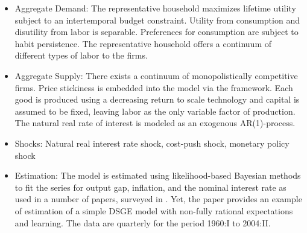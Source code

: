 \documentclass[11pt,a4paper]{article}
\begin{document}
	
	\begin{itemize}
		
		\item Aggregate Demand: The representative household maximizes lifetime utility subject to an intertemporal budget constraint. Utility from consumption and disutility from labor is separable. Preferences for consumption are subject to habit persistence. The representative household offers a continuum of different types of labor to the firms.
		
		\item Aggregate Supply: There exists a continuum of monopolistically competitive firms. Price stickiness is embedded into the model via the \cite{Calvo1983} framework. Each good is produced using a decreasing return to scale technology and capital is assumed to be fixed, leaving labor as the only variable factor of production. The natural real rate of interest is modeled as an exogenous AR(1)-process.
		
		\item Shocks: Natural real interest rate shock, cost-push shock, monetary policy shock
		
		\item Estimation: The model is estimated using likelihood-based Bayesian methods to fit the series for output gap, inflation, and the nominal interest rate as used in a number of papers, surveyed in \cite{an2007bayesian}. Yet, the paper provides an example of estimation of a simple DSGE model with non-fully rational expectations and learning. The data are quarterly for the period 1960:I to 2004:II.
		
	\end{itemize}
	
\end{document}

